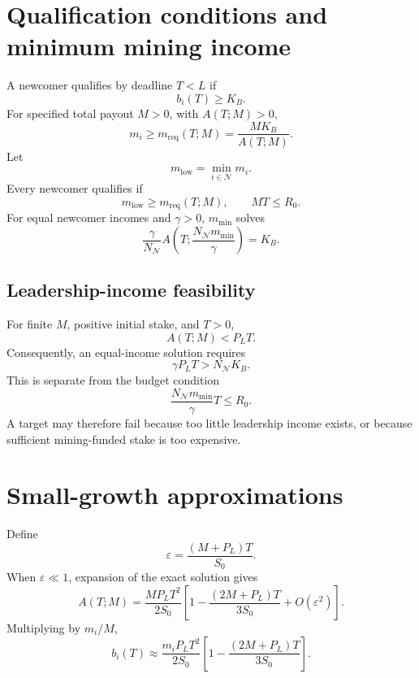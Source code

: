 \documentclass[11pt,a4paper]{article}
\begin{document}
\section{Qualification conditions and minimum mining income}\label{sec:qualification}
A newcomer qualifies by deadline $T<L$ if
\begin{equation}
b_i(T)\ge K_B.
\end{equation}
For specified total payout $M>0$, with $A(T;M)>0$,
\begin{equation}
\boxed{m_i\ge m_{\mathrm{req}}(T;M)=\frac{MK_B}{A(T;M)}.}
\end{equation}
Let
\begin{equation}
m_{\mathrm{low}}=\min_{i\in\mathcal N}m_i.
\end{equation}
Every newcomer qualifies if
\begin{equation}
m_{\mathrm{low}}\ge m_{\mathrm{req}}(T;M),\qquad MT\le R_0.
\end{equation}
For equal newcomer incomes and $\gamma>0$, $m_{\min}$ solves
\begin{equation}
\boxed{\frac{\gamma}{N_{\mathcal N}}A\!\left(T;\frac{N_{\mathcal N}m_{\min}}{\gamma}\right)=K_B.}
\end{equation}

\subsection*{Leadership-income feasibility}
For finite $M$, positive initial stake, and $T>0$,
\begin{equation}
A(T;M)<P_LT.
\end{equation}
Consequently, an equal-income solution requires
\begin{equation}
\boxed{\gamma P_LT>N_{\mathcal N}K_B.}
\end{equation}
This is separate from the budget condition
\begin{equation}
\boxed{\frac{N_{\mathcal N}m_{\min}}{\gamma}T\le R_0.}
\end{equation}
A target may therefore fail because too little leadership income exists, or because sufficient mining-funded stake is too expensive.

\section{Small-growth approximations}
Define
\begin{equation}
\varepsilon=\frac{(M+P_L)T}{S_0}.
\end{equation}
When $\varepsilon\ll1$, expansion of the exact solution gives
\begin{equation}
A(T;M)=\frac{MP_LT^2}{2S_0}\left[1-\frac{(2M+P_L)T}{3S_0}+O(\varepsilon^2)\right].
\end{equation}
Multiplying by $m_i/M$,
\begin{equation}
b_i(T)\approx\frac{m_iP_LT^2}{2S_0}\left[1-\frac{(2M+P_L)T}{3S_0}\right].
\end{equation}
\end{document}

